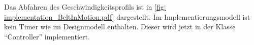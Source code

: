 \documentclass[./\jobname.tex]{subfiles}
\begin{document}
\begin{figure}[H]
	\centering
	\noindent{}
	\label{fig: implementation_Performing.pdf}
\end{figure}
%
\newpage
Das Abfahren des Geschwindigkeitsprofils ist in \autoref{fig: implementation_BeltInMotion.pdf} dargestellt. Im Implementierungsmodell ist kein Timer wie im Designmodell enthalten. Dieser wird jetzt in der Klasse \enquote{Controller} implementiert.
\begin{figure}[H]
\centering
\noindent{}
\label{fig: implementation_BeltInMotion.pdf}
\end{figure} 
%
\end{document}
